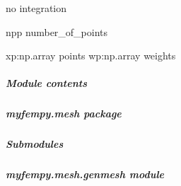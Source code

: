 \documentclass[letterpaper,10pt,english]{sphinxmanual}
\begin{document}

\begin{fulllineitems}
\label{\detokenize{myfempy.felib:myfempy.felib.quadrature.no_interpol}}
\pysigstartsignatures
{}
\pysigstopsignatures
\sphinxAtStartPar
no integration
\begin{description}
\sphinxAtStartPar
npp          \textendash{} number\_of\_points

\sphinxAtStartPar
xp:np.array  \textendash{} points
wp:np.array  \textendash{} weights

\end{description}

\end{fulllineitems}



\subparagraph{Module contents}
\label{\detokenize{myfempy.felib:module-myfempy.felib}}\label{\detokenize{myfempy.felib:module-contents}}
\sphinxstepscope


\subparagraph{myfempy.mesh package}
\label{\detokenize{myfempy.mesh:myfempy-mesh-package}}\label{\detokenize{myfempy.mesh::doc}}

\subparagraph{Submodules}
\label{\detokenize{myfempy.mesh:submodules}}

\subparagraph{myfempy.mesh.genmesh module}
\label{\detokenize{myfempy.mesh:module-myfempy.mesh.genmesh}}\label{\detokenize{myfempy.mesh:myfempy-mesh-genmesh-module}}
\end{document}
